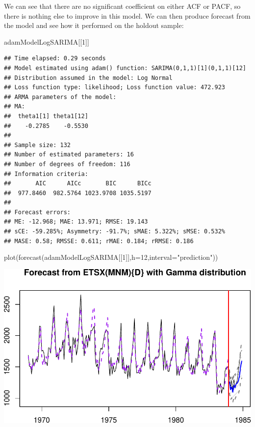 \documentclass[
]{book}
\newenvironment{Shaded}{\begin{snugshade}}{\end{snugshade}}
\newcommand{\AttributeTok}[1]{\textcolor[rgb]{0.77,0.63,0.00}{#1}}
\newcommand{\DecValTok}[1]{\textcolor[rgb]{0.00,0.00,0.81}{#1}}
\newcommand{\FunctionTok}[1]{\textcolor[rgb]{0.00,0.00,0.00}{#1}}
\newcommand{\NormalTok}[1]{#1}
\newcommand{\StringTok}[1]{\textcolor[rgb]{0.31,0.60,0.02}{#1}}
\theoremstyle{definition}
\theoremstyle{definition}
\theoremstyle{definition}
\theoremstyle{definition}
\theoremstyle{remark}
\begin{document}
We can see that there are no significant coefficient on either ACF or PACF, so there is nothing else to improve in this model. We can then produce forecast from the model and see how it performed on the holdout sample:

\begin{Shaded}
\begin{Highlighting}[]
\NormalTok{adamModelLogSARIMA[[}\DecValTok{1}\NormalTok{]]}
\end{Highlighting}
\end{Shaded}

\begin{verbatim}
## Time elapsed: 0.29 seconds
## Model estimated using adam() function: SARIMA(0,1,1)[1](0,1,1)[12]
## Distribution assumed in the model: Log Normal
## Loss function type: likelihood; Loss function value: 472.923
## ARMA parameters of the model:
## MA:
##  theta1[1] theta1[12] 
##    -0.2785    -0.5530 
## 
## Sample size: 132
## Number of estimated parameters: 16
## Number of degrees of freedom: 116
## Information criteria:
##       AIC      AICc       BIC      BICc 
##  977.8460  982.5764 1023.9708 1035.5197 
## 
## Forecast errors:
## ME: -12.968; MAE: 13.971; RMSE: 19.143
## sCE: -59.285%; Asymmetry: -91.7%; sMAE: 5.322%; sMSE: 0.532%
## MASE: 0.58; RMSSE: 0.611; rMAE: 0.184; rRMSE: 0.186
\end{verbatim}

\begin{Shaded}
\begin{Highlighting}[]
\FunctionTok{plot}\NormalTok{(}\FunctionTok{forecast}\NormalTok{(adamModelLogSARIMA[[}\DecValTok{1}\NormalTok{]],}\AttributeTok{h=}\DecValTok{12}\NormalTok{,}\AttributeTok{interval=}\StringTok{"prediction"}\NormalTok{))}
\end{Highlighting}
\end{Shaded}

\includegraphics{adam_files/figure-latex/unnamed-chunk-70-1.pdf}
\end{document}
